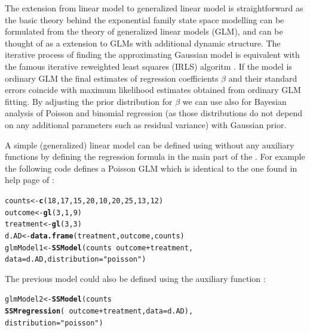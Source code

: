 \documentclass[nojss,article]{jss}\usepackage[]{graphicx}\usepackage[]{color}
\makeatletter
\newcommand{\hlnum}[1]{\textcolor[rgb]{0.686,0.059,0.569}{#1}}%
\newcommand{\hlstr}[1]{\textcolor[rgb]{0.192,0.494,0.8}{#1}}%
\newcommand{\hlopt}[1]{\textcolor[rgb]{0,0,0}{#1}}%
\newcommand{\hlstd}[1]{\textcolor[rgb]{0.345,0.345,0.345}{#1}}%
\newcommand{\hlkwb}[1]{\textcolor[rgb]{0.69,0.353,0.396}{#1}}%
\newcommand{\hlkwc}[1]{\textcolor[rgb]{0.333,0.667,0.333}{#1}}%
\newcommand{\hlkwd}[1]{\textcolor[rgb]{0.737,0.353,0.396}{\textbf{#1}}}%
\newenvironment{kframe}{%
 \def\at@end@of@kframe{}%
 \ifinner\ifhmode%
  \def\at@end@of@kframe{\end{minipage}}%
  \begin{minipage}{\columnwidth}%
 \fi\fi%
 \def\FrameCommand##1{\hskip\@totalleftmargin \hskip-\fboxsep
 \colorbox{shadecolor}{##1}\hskip-\fboxsep
     \hskip-\linewidth \hskip-\@totalleftmargin \hskip\columnwidth}%
 \MakeFramed {\advance\hsize-\width
   \@totalleftmargin\z@ \linewidth\hsize
   \@setminipage}}%
 {\par\unskip\endMakeFramed%
 \at@end@of@kframe}
\newenvironment{knitrout}{}{} %
\makeatother
\begin{document}
The extension from linear model to generalized linear model is straightforward as the basic theory behind the exponential family state space modelling can be formulated from the theory of generalized linear models (GLM), and can be thought of as a extension to GLMs with additional dynamic structure. The iterative process of finding the approximating Gaussian model is equivalent with the famous iterative reweighted least squares (IRLS) algoritm \citep[p.~40]{MN1989}. If the model is ordinary GLM the final estimates of regression coefficients $\beta$ and their standard errors coincide with maximum likelihood estimates obtained from ordinary GLM fitting. By adjusting the prior distribution for $\beta$ we can use  also for Bayesian analysis of Poisson and binomial regression (as those distributions do not depend on any additional parameters such as residual variance) with Gaussian prior.

A simple (generalized) linear model can be defined using  without any auxiliary functions by defining the regression formula in the main part of the . For example the following code defines a Poisson GLM which is identical to the one found in help page of :

\begin{knitrout}
\color{fgcolor}\begin{kframe}
\begin{alltt}
\hlstd{counts} \hlkwb{<-} \hlkwd{c}\hlstd{(}\hlnum{18}\hlstd{,}\hlnum{17}\hlstd{,}\hlnum{15}\hlstd{,}\hlnum{20}\hlstd{,}\hlnum{10}\hlstd{,}\hlnum{20}\hlstd{,}\hlnum{25}\hlstd{,}\hlnum{13}\hlstd{,}\hlnum{12}\hlstd{)}
\hlstd{outcome} \hlkwb{<-} \hlkwd{gl}\hlstd{(}\hlnum{3}\hlstd{,}\hlnum{1}\hlstd{,}\hlnum{9}\hlstd{)}
\hlstd{treatment} \hlkwb{<-} \hlkwd{gl}\hlstd{(}\hlnum{3}\hlstd{,}\hlnum{3}\hlstd{)}
\hlstd{d.AD} \hlkwb{<-} \hlkwd{data.frame}\hlstd{(treatment, outcome, counts)}
\hlstd{glmModel1} \hlkwb{<-} \hlkwd{SSModel}\hlstd{(counts} \hlopt{~} \hlstd{outcome} \hlopt{+} \hlstd{treatment,}
                     \hlkwc{data} \hlstd{= d.AD,} \hlkwc{distribution} \hlstd{=} \hlstr{"poisson"}\hlstd{)}
\end{alltt}
\end{kframe}
\end{knitrout}

The previous model could also be defined using the auxiliary function : 

\begin{knitrout}
\color{fgcolor}\begin{kframe}
\begin{alltt}
\hlstd{glmModel2} \hlkwb{<-} \hlkwd{SSModel}\hlstd{(counts} \hlopt{~}
                       \hlkwd{SSMregression}\hlstd{(}\hlopt{~}\hlstd{outcome} \hlopt{+} \hlstd{treatment,} \hlkwc{data} \hlstd{= d.AD),}
                     \hlkwc{distribution} \hlstd{=} \hlstr{"poisson"}\hlstd{)}
\end{alltt}
\end{kframe}
\end{knitrout}
\end{document}
